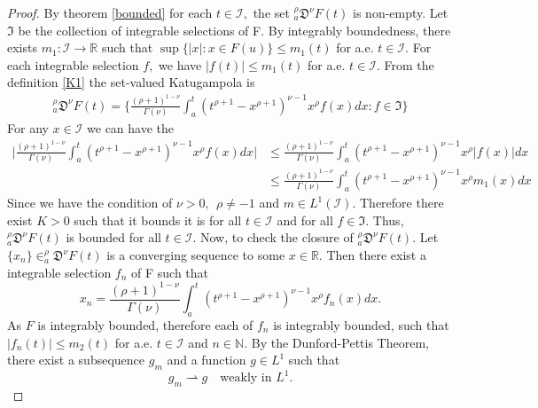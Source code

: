 \documentclass{amsproc}
\theoremstyle{definition}
\theoremstyle{remark}
\numberwithin{equation}{section}
\begin{document}
\begin{proof}
     By theorem \ref{bounded} for each $t\in \mathcal{I},$ the set $_a^\rho\mathfrak{D}^\nu F(t)$ is non-empty. Let $\mathfrak{I}$ be the collection of integrable selections of F. By integrably boundedness, there exists $m_1:\mathcal{I}\to \mathbb{R}$ such that $\sup\{ |x|:x\in F(u)\}\le m_1(t)$ for a.e. $t\in \mathcal{I}.$ For each integrable selection $f,$ we have $|f(t)|\le m_1(t)$ for a.e. $t \in \mathcal{I}.$ From the definition \ref{K1} the set-valued Katugampola is 
     \begin{equation*}
    \begin{aligned}
        _a^\rho\mathfrak{D}^\nu F(t)=\bigg\{\frac{(\rho+1)^{1-\nu}}{\Gamma(\nu)}\int_a^t(t^{\rho+1}-x^{\rho+1})^{\nu-1}x^{\rho}f(x)dx:f\in\mathfrak{I}\bigg\}
    \end{aligned}
\end{equation*}
For any $x\in \mathcal{I}$ we can have the 
\begin{equation*}
    \begin{aligned}
      \Bigg|  \frac{(\rho+1)^{1-\nu}}{\Gamma(\nu)}\int_a^t(t^{\rho+1}-x^{\rho+1})^{\nu-1}x^{\rho}f(x)dx \Bigg| &\le \frac{(\rho+1)^{1-\nu}}{\Gamma(\nu)}\int_a^t(t^{\rho+1}-x^{\rho+1})^{\nu-1}x^{\rho} |f(x)|dx \\ &\le \frac{(\rho+1)^{1-\nu}}{\Gamma(\nu)}\int_a^t(t^{\rho+1}-x^{\rho+1})^{\nu-1}x^{\rho} m_1(x)dx
    \end{aligned}
\end{equation*}
Since we have the condition of $\nu>0, ~~\rho\neq-1$ and $m \in L^1(\mathcal{I}).$ Therefore there exist $K>0$ such that it bounds it is for all $t \in \mathcal{I}$ and for all $f\in \mathfrak{I}.$ Thus, $_a^\rho\mathfrak{D}^\nu F(t)$ is bounded for all $t\in \mathcal{I}.$ Now, to check the closure of  $_a^\rho\mathfrak{D}^\nu F(t).$ Let $\{x_n\} \in _a^\rho\mathfrak{D}^\nu F(t)$ is a converging sequence to some $x\in \mathbb{R}.$ Then there exist a integrable selection $f_n$ of F such that 
\[ x_n= \frac{(\rho+1)^{1-\nu}}{\Gamma(\nu)}\int_a^t(t^{\rho+1}-x^{\rho+1})^{\nu-1}x^{\rho}f_n(x)dx. \] 
As $F$ is integrably bounded, therefore each of $f_n$ is integrably bounded, such that $|f_n(t)|\le m_2(t)$ for a.e. $t\in \mathcal{I}$ and $n\in \mathbb{N}.$ By the Dunford-Pettis Theorem, there exist a subsequence $g_{m}$ and a function $g \in L^1$ such that
\[
g_{m} \rightharpoonup g
\quad \text{weakly in } L^1.
\]

\end{proof}
\end{document}
